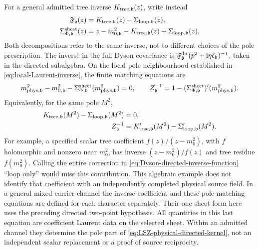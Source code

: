 \documentclass[final,5p,times,twocolumn,numbers,nopreprintline]{elsarticle}
\numberwithin{equation}{section}
\theoremstyle{definition}
\theoremstyle{remark}
\newcommand{\ii}{\mathrm i}
\newcommand{\bb}{\mathfrak b}
\newcommand{\Ph}{\Phi}
\newcommand{\epsvec}{\hat\epsilon_{\bb}}
\begin{document}
For a general admitted tree inverse \(K_{{\rm tree},\bb}(z)\),
write instead
\begin{equation}
 \begin{aligned}
  \mathfrak F_{\bb}(z)
     &=K_{{\rm tree},\bb}(z)-\Sigma_{{\rm loop},\bb}(z),\\
  \Sigma^{\rm sheet}_{\Ph,\bb}(z)
     &=z-m_{0,\bb}^2-K_{{\rm tree},\bb}(z)
         +\Sigma_{{\rm loop},\bb}(z).
 \end{aligned}
 \label{eq:tree-versus-loop-inverse}
\end{equation}
Both decompositions refer to the same inverse, not to different
choices of the pole prescription.
The inverse in the full Dyson covariance is
\(\mathfrak F^{\rm dir}_{\bb}
(p^2+\ii\eta\epsvec)^{-1}\), taken in the directed
subalgebra. On the local pole neighbourhood established in
\eqref{eq:local-Laurent-inverse}, the finite matching equations are
\begin{equation}
 m_{\rm phys,\bb}^2-m_{0,\bb}^2
     -\Sigma^{\rm sheet}_{\Ph,\bb}(m_{\rm phys,\bb}^2)=0,
 \qquad
 Z_{\bb}^{-1}
     =1-(\Sigma^{\rm sheet}_{\Ph,\bb})'
                               (m_{\rm phys,\bb}^2).
 \label{eq:finite-pole-matching}
\end{equation}
Equivalently, for the same pole \(M^2\),
\begin{equation}
 \begin{aligned}
  K_{{\rm tree},\bb}(M^2)-\Sigma_{{\rm loop},\bb}(M^2)&=0,\\
  Z_{\bb}^{-1}
    &=K_{{\rm tree},\bb}'(M^2)-\Sigma_{{\rm loop},\bb}'(M^2).
 \end{aligned}
 \label{eq:general-tree-pole-matching}
\end{equation}
For example, a specified scalar tree coefficient
\(f(z)/(z-m_0^2)\), with \(f\) holomorphic and nonzero near
\(m_0^2\), has inverse \((z-m_0^2)/f(z)\) and tree residue
\(f(m_0^2)\). Calling the entire correction in
\eqref{eq:Dyson-directed-inverse-function} ``loop only'' would
miss this contribution. This algebraic example does not identify
that coefficient with an independently completed physical source field.
In a general mixed carrier channel the inverse coefficient and
these pole-matching equations are defined for each character
separately. Their one-sheet form here uses the preceding directed
two-point hypothesis.
All quantities in this last equation are coefficient Laurent
data on the selected sheet. Within an admitted channel they determine the pole part of
\eqref{eq:LSZ-physical-directed-kernel}, not an independent
scalar replacement or a proof of source reciprocity.
\end{document}
